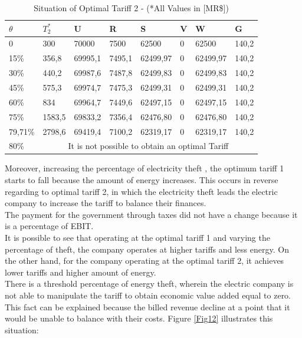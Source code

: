 \documentclass[10pt, letterpaper]{elsarticle}
\begin{document}
\begin{table}[h]%
\centering
\caption{Situation of Optimal Tariff 2 - (*All Values in [MR\$])}

\begin{tabular}{p{15mm}p{15mm}p{15mm}p{15mm}p{15mm}p{6mm}p{15mm}p{15mm}}%
\hline
$\theta$&$T_2^*$&U&R&S&V&W&G\\
\hline
0&300&70000&7500&62500&0&62500&140,2\\
15\%&356,8&69995,1&7495,1&62499,97&0&62499,97&140,2\\
30\%&440,2&69987,6&7487,8&62499,83&0&62499,83&140,2\\
45\%&575,3&69974,7&7475,3&62499,31&0&62499,31&140,2\\
60\%&834&69964,7&7449,6&62497,15&0&62497,15&140,2\\
75\%&1583,5&69833,2&7356,4&62476,80&0&62476,80&140,2\\
79,71\%&2798,6&69419,4&7100,2&62319,17&0&62319,17&140,2\\
80\%&\multicolumn{7}{c}{It is not possible to obtain an optimal Tariff}\\

\hline
\end{tabular}
\label{tD}
\end{table}
Moreover, increasing the percentage of electricity theft , the optimum tariff 1 starts to fall because the amount of energy increases. This occurs in reverse regarding to optimal tariff 2, in which the electricity theft leads the electric company to increase the tariff to balance their finances. \\

The payment for the government through taxes did not have a change because it is a percentage of EBIT. \\
It is possible to see that operating at the optimal tariff 1 and varying the percentage of theft, the company operates at higher tariffs and less energy. On the other hand, for the company operating at the optimal tariff 2, it achieves lower tariffs and higher amount of energy. \\
There is a threshold percentage of energy theft, wherein the electric company is not able to manipulate the tariff to obtain economic value added equal to zero. This fact can be explained because the billed revenue decline at a point that it would be unable to balance with their costs. Figure \ref{Fig12} illustrates this situation:\\
\end{document}
